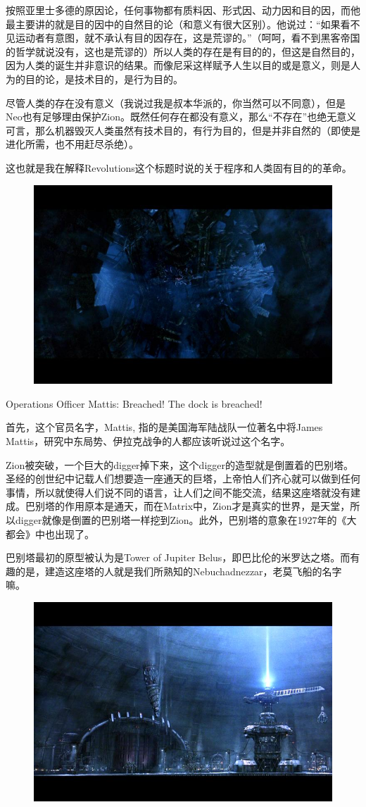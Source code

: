 \documentclass[UTF8]{ctexart}
\newenvironment{myquote}{\color{green} \setlength{\leftskip}{6em} \setlength{\rightskip}{4em} \setlength{\parindent}{-2em}}{\par}
\begin{document}
按照亚里士多德的原因论，任何事物都有质料因、形式因、动力因和目的因，而他最主要讲的就是目的因中的自然目的论（和意义有很大区别）。他说过：“如果看不见运动者有意图，就不承认有目的因存在，这是荒谬的。”（呵呵，看不到黑客帝国的哲学就说没有，这也是荒谬的）所以人类的存在是有目的的，但这是自然目的，因为人类的诞生并非意识的结果。而像尼采这样赋予人生以目的或是意义，则是人为的目的论，是技术目的，是行为目的。

尽管人类的存在没有意义（我说过我是叔本华派的，你当然可以不同意），但是Neo也有足够理由保护Zion。既然任何存在都没有意义，那么“不存在”也绝无意义可言，那么机器毁灭人类虽然有技术目的，有行为目的，但是并非自然的（即使是进化所需，也不用赶尽杀绝）。

这也就是我在解释Revolutions这个标题时说的关于程序和人类固有目的的革命。

\begin{figure}[htb]
\centering
\includegraphics[width=0.5\linewidth]{fig/d272b81259316fcec2fd7854.jpg}
\end{figure}

\begin{myquote}
Operations Officer Mattis: Breached! The dock is breached!
\end{myquote}

首先，这个官员名字，Mattis, 指的是美国海军陆战队一位著名中将James Mattis，研究中东局势、伊拉克战争的人都应该听说过这个名字。

Zion被突破，一个巨大的digger掉下来，这个digger的造型就是倒置着的巴别塔。圣经的创世纪中记载人们想要造一座通天的巨塔，上帝怕人们齐心就可以做到任何事情，所以就使得人们说不同的语言，让人们之间不能交流，结果这座塔就没有建成。巴别塔的作用原本是通天，而在Matrix中，Zion才是真实的世界，是天堂，所以digger就像是倒置的巴别塔一样挖到Zion。此外，巴别塔的意象在1927年的《大都会》中也出现了。

巴别塔最初的原型被认为是Tower of Jupiter Belus，即巴比伦的米罗达之塔。而有趣的是，建造这座塔的人就是我们所熟知的Nebuchadnezzar，老莫飞船的名字嘛。

\begin{figure}[htb]
\centering
\includegraphics[width=0.5\linewidth]{fig/9f1903089ad2bcd162d986ee.jpg}
\end{figure}
\end{document}
